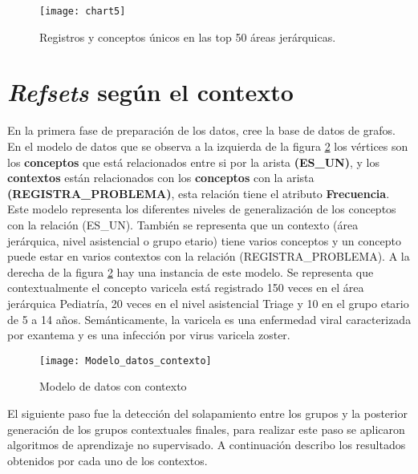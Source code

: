 \begin{figure}[htbp]
\caption{Registros y conceptos únicos en las top 50 áreas jerárquicas.}
\label{fig:listaArea}
\centering
\texttt{[image: chart5]}
\end{figure}


\section{\textit{Refsets} según el contexto}

En la primera fase de preparación de los datos, cree la base de datos de grafos. En el modelo de datos que se observa a la izquierda de la figura \ref{fig:ModeloDatosContexto} los vértices son los \textbf{conceptos} que está relacionados entre si por la arista \textbf{(ES\_UN)}, y los \textbf{contextos} están relacionados con los \textbf{conceptos} con la arista \textbf{(REGISTRA\_PROBLEMA)}, esta relación tiene el atributo \textbf{Frecuencia}. Este modelo representa los diferentes niveles de generalización de los conceptos con la relación (ES\_UN). También se representa que un contexto (área jerárquica, nivel asistencial o grupo etario) tiene varios conceptos y un concepto puede estar en varios contextos con la relación (REGISTRA\_PROBLEMA). A la derecha de la figura  \ref{fig:ModeloDatosContexto} hay una instancia de este modelo. Se representa que contextualmente el concepto varicela está registrado 150 veces en el área jerárquica Pediatría, 20 veces en el nivel asistencial Triage y 10 en el grupo etario de 5 a 14 años. Semánticamente, la varicela es una enfermedad viral caracterizada por exantema y es una infección por virus varicela zoster.

\begin{figure}[htbp]
\caption{Modelo de datos con contexto}
\label{fig:ModeloDatosContexto}
\centering
\texttt{[image: Modelo\_datos\_contexto]}
\end{figure}

El siguiente paso fue la detección del solapamiento entre los grupos y la posterior generación de los grupos contextuales finales, para realizar este paso se aplicaron algoritmos de aprendizaje no supervisado. A continuación describo los resultados obtenidos por cada uno de los contextos.

